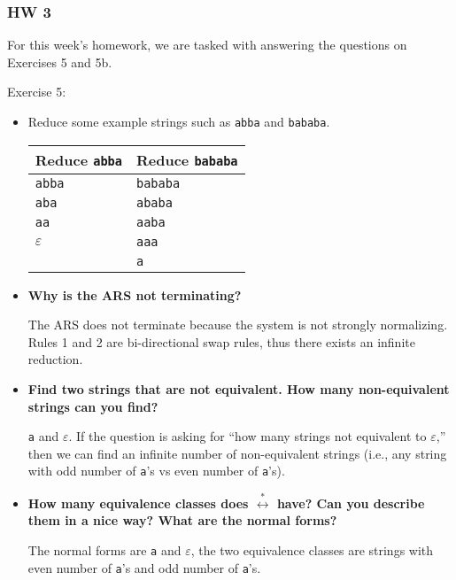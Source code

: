 \documentclass{article}
\theoremstyle{theorem}
\theoremstyle{definition}
\theoremstyle{remark}
\begin{document}
\subsubsection{HW 3}

For this week's homework, we are tasked with answering the questions on Exercises 5 and 5b.

Exercise 5:


\begin{itemize}
    \item Reduce some example strings such as \texttt{abba} and \texttt{bababa}.
\begin{center}
\begin{tabular}{l l}
\textbf{Reduce \texttt{abba}} & \textbf{Reduce \texttt{bababa}}\\ \hline
\texttt{abba}                 & \texttt{bababa} \\
\texttt{aba}                  & \texttt{ababa}  \\
\texttt{aa}                   & \texttt{aaba}   \\
\texttt{$\varepsilon$}        & \texttt{aaa}    \\
                              & \texttt{a}      \\
\end{tabular}
\end{center}
    
  \item \textbf{Why is the ARS not terminating?}

  The ARS does not terminate because the system is not strongly normalizing. Rules 1 and 2 are bi-directional swap rules, thus there exists an infinite reduction.

  \item \textbf{Find two strings that are not equivalent. How many non-equivalent strings can you find?}

  \texttt{a} and $\varepsilon$. If the question is asking for “how many strings not equivalent to $\varepsilon$,” then we can find an infinite number of non-equivalent strings (i.e., any string with odd number of \texttt{a}'s vs even number of \texttt{a}'s).

  \item \textbf{How many equivalence classes does $\stackrel{\ast}{\longleftrightarrow}$ have? Can you describe them in a nice way? What are the normal forms?}

  The normal forms are \texttt{a} and $\varepsilon$, the two equivalence classes are strings with even number of \texttt{a}'s and odd number of \texttt{a}'s.


\end{itemize}
\end{document}
